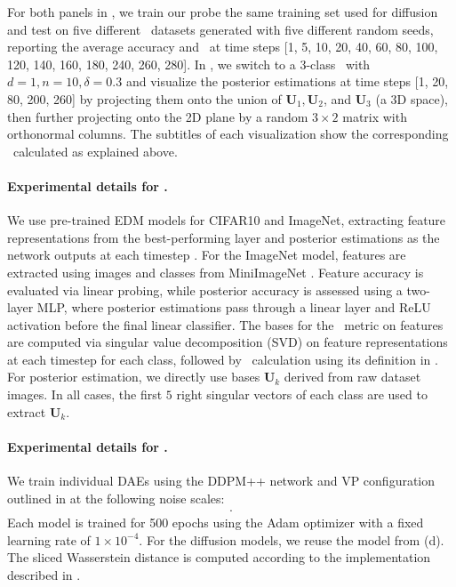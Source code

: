 For both panels in , we train our probe the same training set used for diffusion and test on five different \MoLRG~datasets generated with five different random seeds, reporting the average accuracy and \CSNR~at time steps [1, 5, 10, 20, 40, 60, 80, 100, 120, 140, 160, 180, 240, 260, 280]. In , we switch to a 3-class \MoLRG~with $d=1, n=10, \delta=0.3$ and visualize the posterior estimations at time steps [1, 20, 80, 200, 260] by projecting them onto the union of $\bm U_1, \bm U_2$, and $\bm U_3$ (a 3D space), then further projecting onto the 2D plane by a random $3 \times 2$ matrix with orthonormal columns. The subtitles of each visualization show the corresponding \CSNR~calculated as explained above.

\paragraph{Experimental details for .}
We use pre-trained EDM models \citep{karras2022elucidating} for CIFAR10 and ImageNet, extracting feature representations from the best-performing layer and posterior estimations as the network outputs at each timestep . For the ImageNet model, features are extracted using images and classes from MiniImageNet \citep{vinyals2016matching}. Feature accuracy is evaluated via linear probing, while posterior accuracy is assessed using a two-layer MLP, where posterior estimations pass through a linear layer and ReLU activation before the final linear classifier. The bases for the \CSNR~metric on features are computed via singular value decomposition (SVD) on feature representations at each timestep for each class, followed by \CSNR~calculation using its definition in . For posterior estimation, we directly use bases $\bm U_k$ derived from raw dataset images. In all cases, the first $5$ right singular vectors of each class are used to extract $\bm U_k$.

\paragraph{Experimental details for .}
We train individual DAEs using the DDPM++ network and VP configuration outlined in \citet{karras2022elucidating} at the following noise scales: 
\begin{align*}
    [0.002, 0.008, 0.023, 0.06, 0.14, 0.296, 0.585, 1.088, 1.923, 3.257].
\end{align*} 
Each model is trained for 500 epochs using the Adam optimizer \citep{kingma2014adam} with a fixed learning rate of $1 \times 10^{-4}$. For the diffusion models, we reuse the model from (d). The sliced Wasserstein distance is computed according to the implementation described in \citet{doan2024assessing}.

